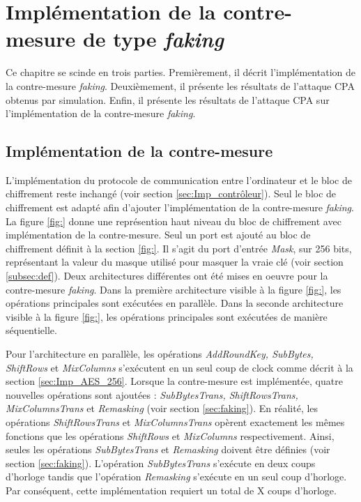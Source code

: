 \documentclass[oneside]{book}
\begin{document}
\newpage


\chapter{Implémentation de la contre-mesure de type \textit{faking}}
\label{chap:faking}

Ce chapitre se scinde en trois parties. Premièrement, il décrit l'implémentation de la contre-mesure \textit{faking}. Deuxièmement, il présente les résultats de l'attaque CPA obtenus par simulation. Enfin, il présente les résultats de l'attaque CPA sur l'implémentation de la contre-mesure \textit{faking}. 

\section{Implémentation de la contre-mesure}
\label{sec:implementation_faking}

L'implémentation du protocole de communication entre l'ordinateur et le bloc de chiffrement reste inchangé (voir section \ref{sec:Imp_contrôleur}). Seul le bloc de chiffrement est adapté afin d'ajouter l'implémentation de la contre-mesure \textit{faking}. La figure \ref{fig:} donne une représention haut niveau du bloc de chiffrement avec implémentation de la contre-mesure. Seul un port est ajouté au bloc de chiffrement définit à la section \ref{fig:}. Il s'agit du port d'entrée \textit{Mask}, sur 256 bits, représentant la valeur du masque utilisé pour masquer la vraie clé (voir section \ref{subsec:def}). Deux architectures différentes ont été mises en oeuvre pour la contre-mesure \textit{faking}. Dans la première architecture visible à la figure \ref{fig:}, les opérations principales sont exécutées en parallèle. Dans la seconde architecture visible à la figure \ref{fig:}, les opérations principales sont exécutées de manière séquentielle.

Pour l'architecture en parallèle, les opérations \textit{AddRoundKey, SubBytes, ShiftRows} et \textit{MixColumns} s'exécutent en un seul coup de clock comme décrit à la section \ref{sec:Imp_AES_256}. Lorsque la contre-mesure est implémentée, quatre nouvelles opérations sont ajoutées : \textit{SubBytesTrans, ShiftRowsTrans, MixColumnsTrans} et \textit{Remasking} (voir section \ref{sec:faking}). En réalité, les opérations \textit{ShiftRowsTrans} et \textit{MixColumnsTrans} opèrent exactement les mêmes fonctions que les opérations \textit{ShiftRows} et \textit{MixColumns} respectivement. Ainsi, seules les opérations \textit{SubBytesTrans} et \textit{Remasking} doivent être définies (voir section \ref{sec:faking}). L'opération \textit{SubBytesTrans} s'exécute en deux coups d'horloge tandis que l'opération \textit{Remasking} s'exécute en un seul coup d'horloge. Par conséquent, cette implémentation requiert un total de X coups d'horloge.
\end{document}
